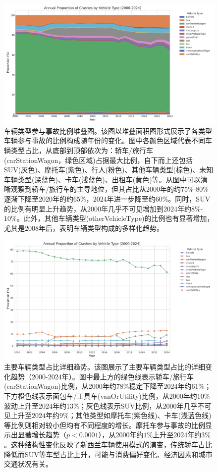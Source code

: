 \documentclass[12pt,a4paper]{article}
\begin{document}
\begin{figure}[H]
\centering
\includegraphics[height=0.25\textheight]{vehicle_type_area_chart.png}
\caption{车辆类型参与事故比例堆叠图。该图以堆叠面积图形式展示了各类型车辆参与事故的比例构成随年份的变化。图中各颜色区域代表不同车辆类型占比，从底部到顶部依次为：轿车/旅行车(carStationWagon，绿色区域)占据最大比例，自下而上还包括SUV(灰色)、摩托车(紫色)、行人(粉色)、其他车辆类型(棕色)、未知车辆类型(深蓝色)、卡车(浅蓝色)、出租车(黄色)等。从图中可以清晰观察到轿车/旅行车的主导地位，但其占比从$2000$年的约$75\%$-$80\%$逐渐下降至$2020$年的约$65\%$，$2024$年进一步降至约$60\%$。同时，SUV的比例有明显上升趋势，从$2000$年几乎不可见增加到$2024$年约$8\%$-$10\%$。此外，其他车辆类型(otherVehicleType)的比例也有显著增加，尤其是$2008$年后，表明车辆类型构成的多样化趋势。}
\label{fig:vehicle_type_area_chart}
\end{figure}

\begin{figure}[H]
\centering
\includegraphics[height=0.3\textheight]{vehicle_type_proportion_trends.png}
\caption{主要车辆类型占比详细趋势。该图展示了主要车辆类型占比的详细变化趋势（$2000$-$2024$年）。图中最上方的绿色线表示轿车/旅行车(carStationWagon)比例，从$2000$年约$78\%$稳定下降至$2024$年约$61\%$；下方橙色线表示面包车/工具车(vanOrUtility)比例，从$2000$年约$10\%$波动上升至$2024$年约$13\%$；灰色线表示SUV比例，从$2000$年几乎不可见上升至$2024$年约$9\%$；其他类型如摩托车(紫色线)、卡车(浅蓝色线)等比例则相对较小但均有不同程度的增长。摩托车参与事故的比例显示出显著增长趋势（$p < 0.0001$），从$2000$年约$1\%$上升至$2024$年约$3\%$。这种结构性变化反映了新西兰车辆使用模式的演变，传统轿车占比降低而SUV等车型占比上升，可能与消费偏好变化、经济因素和城市交通状况有关。}
\label{fig:vehicle_type_proportion_trends}
\end{figure}
\end{document}

